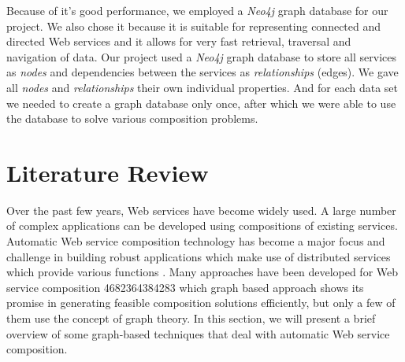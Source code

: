Because of it's good performance, we employed a \emph{Neo4j} \cite{6} graph database for our project. We also chose it because it is suitable for representing connected and directed Web services and it allows for very fast retrieval, traversal and navigation of data. Our project used a \emph{Neo4j} graph database to store all services as \emph{nodes} and dependencies between the services as \emph{relationships} (edges). We gave all \emph{nodes} and \emph{relationships} their own individual properties. And for each data set we needed to create a graph database only once, after which we were able to use the database to solve various composition problems. \par

\section{Literature Review}
Over the past few years, Web services have become widely used. A large number of complex applications can be developed using compositions of existing services. Automatic Web service composition technology has become a major focus and challenge in building robust applications which make use of distributed services which provide various functions \cite{29}. Many approaches have been developed for Web service composition     4682364384283    which graph based approach shows its promise in generating feasible composition solutions efficiently, but only a few of them use the concept of graph theory. In this section, we will present a brief overview of some graph-based techniques that deal with automatic Web service composition.
\par

